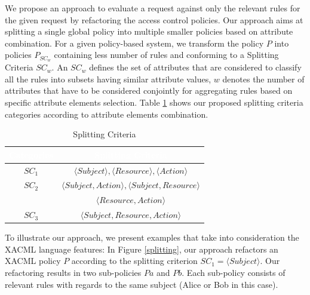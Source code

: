 We propose an approach to evaluate a request against only the relevant rules for the given request by refactoring the access control policies. Our approach aims at splitting a single global policy into 
multiple smaller policies based on attribute combination. For a given policy-based system, we transform the policy \normalsize $P$ into 
policies \normalsize $P_{SC_{w}}$ containing less number of rules and conforming to a Splitting Criteria $SC_{w}$. 
An $SC_{w}$ defines the set of attributes that are considered to classify all the rules into subsets having similar attribute values, 
$w$ denotes 
the number of attributes that have to be considered conjointly for aggregating rules based on specific attribute elements selection. 
Table \ref{table1} 
shows our proposed splitting criteria categories according to attribute elements combination.
\begin{table}[h!]
\centering
\setlength{\extrarowheight}{6 pt}
\begin{tabular}{|>{\small}c|>{\small}c|}
\hline \rowcolor{black}
\bf
\textcolor{white}{Categories}& \bf \textcolor{white}{Splitting Criteria}\\ \hline
$SC_{1}$& {$\langle Subject \rangle, \langle Resource\rangle, \langle Action\rangle$}\\ \hline
$SC_{2}$& {$\langle Subject,Action \rangle, \langle Subject,Resource\rangle$}\\&{$\langle Resource,Action\rangle$}\\ \hline
$SC_{3}$& {$\langle Subject,Resource,Action\rangle$}\\ \hline
\end{tabular}
\caption{Splitting Criteria}
\label{table1}\end{table}

To illustrate our approach, we present examples that take into consideration the XACML language features:
In Figure \ref{splitting}, our approach refactors an XACML policy $P$  according to the splitting criterion $SC_{1}=\langle Subject\rangle$. Our refactoring results 
in two sub-policies $Pa$ and $Pb$. Each sub-policy consists of relevant rules with regards to the same subject (Alice or Bob in this case). 

